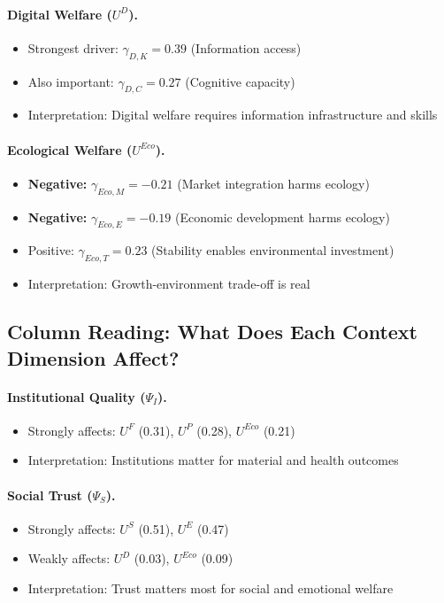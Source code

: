 \paragraph{Digital Welfare ($U^D$).}
\begin{itemize}
\item Strongest driver: $\gamma_{D,K} = 0.39$ (Information access)
\item Also important: $\gamma_{D,C} = 0.27$ (Cognitive capacity)
\item Interpretation: Digital welfare requires information infrastructure and skills
\end{itemize}

\paragraph{Ecological Welfare ($U^{Eco}$).}
\begin{itemize}
\item \textbf{Negative:} $\gamma_{Eco,M} = -0.21$ (Market integration harms ecology)
\item \textbf{Negative:} $\gamma_{Eco,E} = -0.19$ (Economic development harms ecology)
\item Positive: $\gamma_{Eco,T} = 0.23$ (Stability enables environmental investment)
\item Interpretation: Growth-environment trade-off is real
\end{itemize}

\subsection{Column Reading: What Does Each Context Dimension Affect?}

\paragraph{Institutional Quality ($\Psi_I$).}
\begin{itemize}
\item Strongly affects: $U^F$ (0.31), $U^P$ (0.28), $U^{Eco}$ (0.21)
\item Interpretation: Institutions matter for material and health outcomes
\end{itemize}

\paragraph{Social Trust ($\Psi_S$).}
\begin{itemize}
\item Strongly affects: $U^S$ (0.51), $U^E$ (0.47)
\item Weakly affects: $U^D$ (0.03), $U^{Eco}$ (0.09)
\item Interpretation: Trust matters most for social and emotional welfare
\end{itemize}

